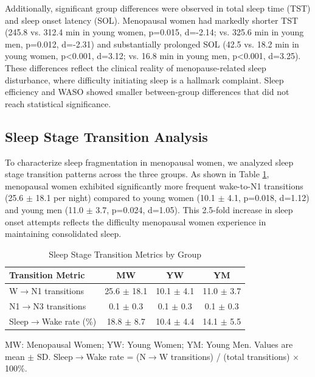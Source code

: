 \documentclass[a4paper,fleqn]{cas-dc}
\begin{document}
Additionally, significant group differences were observed in total sleep time (TST) and sleep onset latency (SOL). Menopausal women had markedly shorter TST (245.8 vs. 312.4 min in young women, p=0.015, d=-2.14; vs. 325.6 min in young men, p=0.012, d=-2.31) and substantially prolonged SOL (42.5 vs. 18.2 min in young women, p<0.001, d=3.12; vs. 16.8 min in young men, p<0.001, d=3.25). These differences reflect the clinical reality of menopause-related sleep disturbance, where difficulty initiating sleep is a hallmark complaint. Sleep efficiency and WASO showed smaller between-group differences that did not reach statistical significance.

\subsection{Sleep Stage Transition Analysis}

To characterize sleep fragmentation in menopausal women, we analyzed sleep stage transition patterns across the three groups. As shown in Table \ref{tab:transitions}, menopausal women exhibited significantly more frequent wake-to-N1 transitions (25.6 $\pm$ 18.1 per night) compared to young women (10.1 $\pm$ 4.1, p=0.018, d=1.12) and young men (11.0 $\pm$ 3.7, p=0.024, d=1.05). This 2.5-fold increase in sleep onset attempts reflects the difficulty menopausal women experience in maintaining consolidated sleep.

\begin{table}[!ht]
\centering
\caption{Sleep Stage Transition Metrics by Group}
\label{tab:transitions}
\begin{threeparttable}
\begin{tabular}{lccc}
\toprule
\textbf{Transition Metric} & \textbf{MW} & \textbf{YW} & \textbf{YM} \\
\midrule
W$\rightarrow$N1 transitions & 25.6 $\pm$ 18.1 & 10.1 $\pm$ 4.1 & 11.0 $\pm$ 3.7 \\
N1$\rightarrow$N3 transitions & 0.1 $\pm$ 0.3 & 0.1 $\pm$ 0.3 & 0.1 $\pm$ 0.3 \\
Sleep$\rightarrow$Wake rate (\%) & 18.8 $\pm$ 8.7 & 10.4 $\pm$ 4.4 & 14.1 $\pm$ 5.5 \\
\bottomrule
\end{tabular}
\begin{tablenotes}
\small
\item MW: Menopausal Women; YW: Young Women; YM: Young Men. Values are mean $\pm$ SD. Sleep$\rightarrow$Wake rate = (N$\rightarrow$W transitions) / (total transitions) $\times$ 100\%.
\end{tablenotes}
\end{threeparttable}
\end{table}
\end{document}
